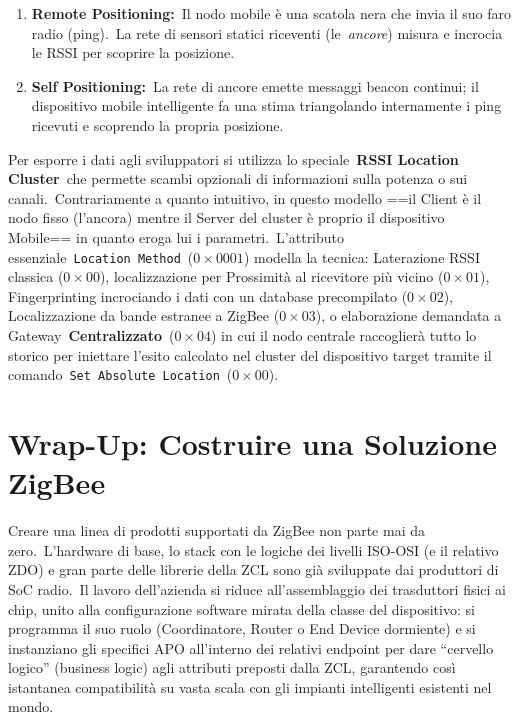 \documentclass[
  italian,
  openany]{book}
\begin{document}
\begin{enumerate}
\def\labelenumi{\arabic{enumi}.}
\item
  \textbf{Remote Positioning:}~Il nodo mobile è una scatola nera che
  invia il suo faro radio (ping).~La rete di sensori statici riceventi
  (le~\emph{ancore}) misura e incrocia le RSSI per scoprire la
  posizione.
\item
  \textbf{Self Positioning:}~La rete di ancore emette messaggi beacon
  continui; il dispositivo mobile intelligente fa una stima triangolando
  internamente i ping ricevuti e scoprendo la propria posizione.
\end{enumerate}

Per esporre i dati agli sviluppatori si utilizza lo
speciale~\textbf{RSSI Location Cluster}~che permette scambi opzionali di
informazioni sulla potenza o sui canali.~Contrariamente a quanto
intuitivo, in questo modello ==il Client è il nodo fisso (l'ancora)
mentre il Server del cluster è proprio il dispositivo Mobile== in quanto
eroga lui i parametri.~L'attributo
essenziale~\texttt{Location\ Method}~(\(0\times0001\)) modella la
tecnica: Laterazione RSSI classica (\(0\times00\)), localizzazione per
Prossimità al ricevitore più vicino (\(0\times01\)), Fingerprinting
incrociando i dati con un database precompilato (\(0\times02\)),
Localizzazione da bande estranee a ZigBee (\(0\times03\)), o
elaborazione demandata a Gateway~\textbf{Centralizzato}~(\(0\times04\))
in cui il nodo centrale raccoglierà tutto lo storico per iniettare
l'esito calcolato nel cluster del dispositivo target tramite il
comando~\texttt{Set\ Absolute\ Location}~(\(0\times00\)).

\section{Wrap-Up: Costruire una Soluzione
ZigBee}\label{wrap-up-costruire-una-soluzione-zigbee}

Creare una linea di prodotti supportati da ZigBee non parte mai da
zero.~L'hardware di base, lo stack con le logiche dei livelli ISO-OSI (e
il relativo ZDO) e gran parte delle librerie della ZCL sono già
sviluppate dai produttori di SoC radio.~Il lavoro dell'azienda si riduce
all'assemblaggio dei trasduttori fisici ai chip, unito alla
configurazione software mirata della classe del dispositivo: si
programma il suo ruolo (Coordinatore, Router o End Device dormiente) e
si instanziano gli specifici APO all'interno dei relativi endpoint per
dare ``cervello logico'' (business logic) agli attributi preposti dalla
ZCL, garantendo così istantanea compatibilità su vasta scala con gli
impianti intelligenti esistenti nel mondo.
\end{document}
